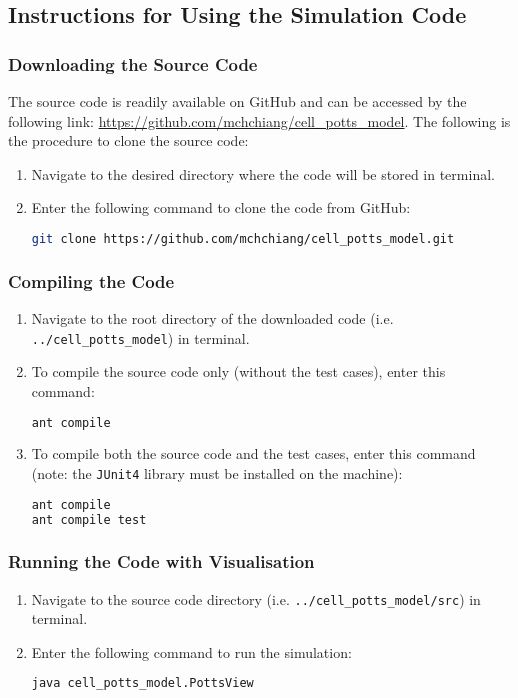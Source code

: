 \documentclass[a4paper,12pt]{article}
\begin{document}
\subsection{Instructions for Using the Simulation Code}
\subsubsection{Downloading the Source Code}
The source code is readily available on GitHub and can be accessed by the following link: \url{https://github.com/mchchiang/cell_potts_model}. The following is the procedure to clone the source code:
\begin{enumerate}
\item Navigate to the desired directory where the code will be stored in terminal.
\item Enter the following command to clone the code from GitHub:
\begin{lstlisting}[language=bash, basicstyle={\small\ttfamily}]
git clone https://github.com/mchchiang/cell_potts_model.git
\end{lstlisting}
\end{enumerate}


\subsubsection{Compiling the Code}
\begin{enumerate}
\item Navigate to the root directory of the downloaded code (i.e. \texttt{../cell\_potts\_model}) in terminal.
\item To compile the source code only (without the test cases), enter this command:
\begin{lstlisting}[language=bash, basicstyle={\small\ttfamily}]
ant compile
\end{lstlisting}

\item To compile both the source code and the test cases, enter this command (note: the \texttt{JUnit4} library must be installed on the machine):
\begin{lstlisting}[language=bash, basicstyle={\small\ttfamily}]
ant compile
ant compile test
\end{lstlisting}
\end{enumerate}

\subsubsection{Running the Code with Visualisation}
\begin{enumerate}
\item Navigate to the source code directory (i.e. \texttt{../cell\_potts\_model/src}) in terminal.
\item Enter the following command to run the simulation:
\begin{lstlisting}[language=bash, basicstyle={\small\ttfamily}]
java cell_potts_model.PottsView
\end{lstlisting}
\end{enumerate}
\end{document}
